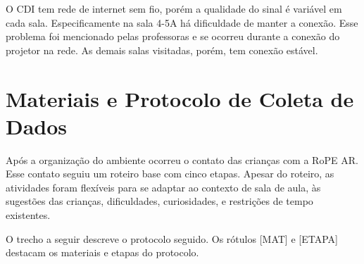 O CDI tem rede de internet sem fio, porém a qualidade do sinal é variável em cada sala. Especificamente na sala 4-5A há dificuldade de manter a conexão. Esse problema foi mencionado pelas professoras e se ocorreu durante a conexão do projetor na rede. As demais salas visitadas, porém, tem conexão estável.

\section{Materiais e Protocolo de Coleta de Dados}
\label{sec:protocolo}
Após a organização do ambiente ocorreu o contato das crianças com a RoPE AR. Esse contato seguiu um roteiro base com cinco etapas. Apesar do roteiro, as atividades foram flexíveis para se adaptar ao contexto de sala de aula, às sugestões das crianças, dificuldades, curiosidades, e restrições de tempo existentes. 

O trecho a seguir descreve o protocolo seguido. Os rótulos [MAT] e [ETAPA] destacam os materiais e etapas do protocolo.

